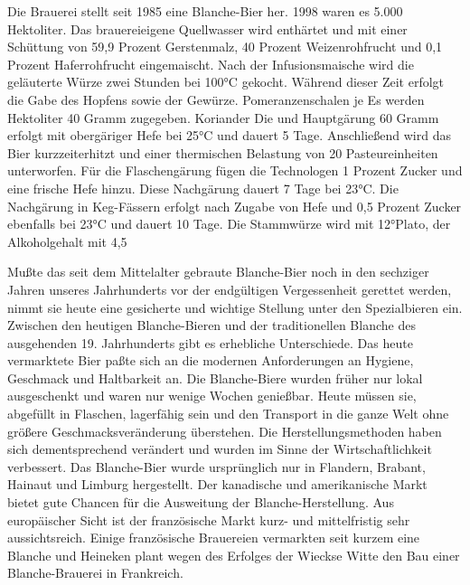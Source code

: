 \documentclass[a4paper,parskip=half]{scrartcl}
\begin{document}
\parencite[94]{Strottner1999}

Die Brauerei stellt seit 1985 eine Blanche-Bier her. 1998 waren es 5.000 Hektoliter.
Das brauereieigene Quellwasser wird enthärtet und mit einer Schüttung von
59,9
Prozent
Gerstenmalz,
40
Prozent
Weizenrohfrucht
und
0,1
Prozent
Haferrohfrucht eingemaischt. Nach der Infusionsmaische wird die geläuterte Würze
zwei Stunden bei 100°C gekocht. Während dieser Zeit erfolgt die Gabe des Hopfens
sowie
der
Gewürze.
Pomeranzenschalen
je
Es
werden
Hektoliter
40
Gramm
zugegeben.
Koriander
Die
und
Hauptgärung
60
Gramm
erfolgt
mit
obergäriger Hefe bei 25°C und dauert 5 Tage. Anschließend wird das Bier
kurzzeiterhitzt
und
einer
thermischen
Belastung
von
20
Pasteureinheiten
unterworfen. Für die Flaschengärung fügen die Technologen 1 Prozent Zucker und
eine frische Hefe hinzu. Diese Nachgärung dauert 7 Tage bei 23°C.
Die Nachgärung in Keg-Fässern erfolgt nach Zugabe von Hefe und 0,5 Prozent
Zucker ebenfalls bei 23°C und dauert 10 Tage.
Die Stammwürze wird mit 12°Plato, der Alkoholgehalt mit 4,5 %

\parencite[118]{Strottner1999}

Mußte das seit dem Mittelalter gebraute Blanche-Bier noch in den sechziger Jahren
unseres Jahrhunderts vor der endgültigen Vergessenheit gerettet werden, nimmt sie
heute eine gesicherte und wichtige Stellung unter den Spezialbieren ein.
Zwischen den heutigen Blanche-Bieren und der traditionellen Blanche des
ausgehenden 19. Jahrhunderts gibt es erhebliche Unterschiede. Das heute
vermarktete Bier paßte sich an die modernen Anforderungen an Hygiene,
Geschmack und Haltbarkeit an. Die Blanche-Biere wurden früher nur lokal
ausgeschenkt und waren nur wenige Wochen genießbar. Heute müssen sie,
abgefüllt in Flaschen, lagerfähig sein und den Transport in die ganze Welt ohne
größere Geschmacksveränderung überstehen. Die Herstellungsmethoden haben
sich dementsprechend verändert und wurden im Sinne der Wirtschaftlichkeit
verbessert.
Das Blanche-Bier wurde ursprünglich nur in Flandern, Brabant, Hainaut und Limburg
hergestellt. Der kanadische und amerikanische Markt bietet gute Chancen für die
Ausweitung der Blanche-Herstellung. Aus europäischer Sicht ist der französische
Markt kurz- und mittelfristig sehr aussichtsreich. Einige französische Brauereien
vermarkten seit kurzem eine Blanche und Heineken plant wegen des Erfolges der
Wieckse Witte den Bau einer Blanche-Brauerei in Frankreich.
\end{document}
